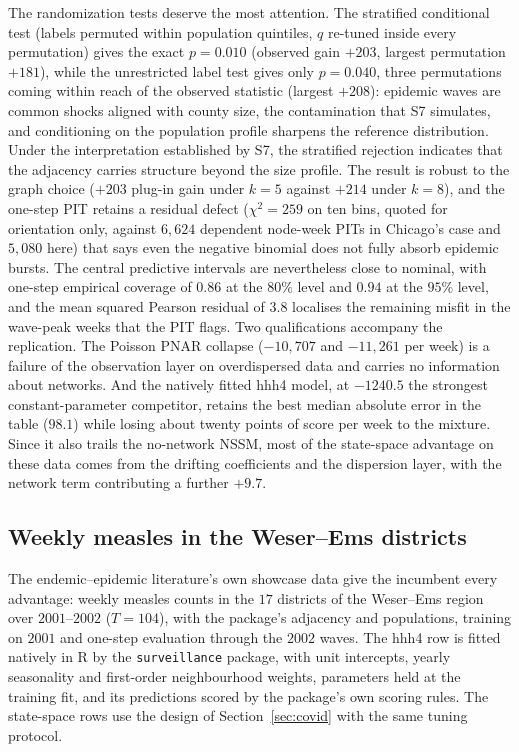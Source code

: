 \documentclass[12pt]{article}
\theoremstyle{plain}
\theoremstyle{definition}
\theoremstyle{remark}
\begin{document}
The randomization tests deserve the most attention. The stratified conditional test (labels permuted within population quintiles, $q$ re-tuned inside every permutation) gives the exact $p=0.010$ (observed gain $+203$, largest permutation $+181$), while the unrestricted label test gives only $p=0.040$, three permutations coming within reach of the observed statistic (largest $+208$): epidemic waves are common shocks aligned with county size, the contamination that S7 simulates, and conditioning on the population profile sharpens the reference distribution. Under the interpretation established by S7, the stratified rejection indicates that the adjacency carries structure beyond the size profile. The result is robust to the graph choice ($+203$ plug-in gain under $k=5$ against $+214$ under $k=8$), and the one-step PIT retains a residual defect ($\chi^2=259$ on ten bins, quoted for orientation only, against $6{,}624$ dependent node-week PITs in Chicago's case and $5{,}080$ here) that says even the negative binomial does not fully absorb epidemic bursts. The central predictive intervals are nevertheless close to nominal, with one-step empirical coverage of $0.86$ at the $80\%$ level and $0.94$ at the $95\%$ level, and the mean squared Pearson residual of $3.8$ localises the remaining misfit in the wave-peak weeks that the PIT flags. Two qualifications accompany the replication. The Poisson PNAR collapse ($-10{,}707$ and $-11{,}261$ per week) is a failure of the observation layer on overdispersed data and carries no information about networks. And the natively fitted hhh4 model, at $-1240.5$ the strongest constant-parameter competitor, retains the best median absolute error in the table ($98.1$) while losing about twenty points of score per week to the mixture. Since it also trails the no-network NSSM, most of the state-space advantage on these data comes from the drifting coefficients and the dispersion layer, with the network term contributing a further $+9.7$.

\subsection{Weekly measles in the Weser--Ems districts}\label{sec:measles}

The endemic--epidemic literature's own showcase data give the incumbent every advantage: weekly measles counts in the $17$ districts of the Weser--Ems region over $2001$--$2002$ ($T=104$), with the package's adjacency and populations, training on $2001$ and one-step evaluation through the $2002$ waves. The hhh4 row is fitted natively in R by the \texttt{surveillance} package, with unit intercepts, yearly seasonality and first-order neighbourhood weights, parameters held at the training fit, and its predictions scored by the package's own scoring rules. The state-space rows use the design of Section~\ref{sec:covid} with the same tuning protocol.
\end{document}
